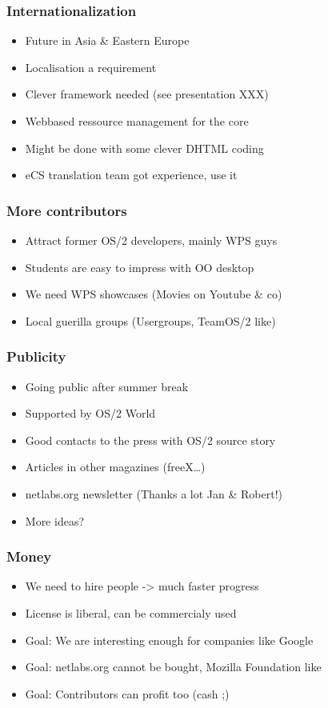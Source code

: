 \documentclass{beamer}
\begin{document}
\begin{frame}
\frametitle{Internationalization}
\begin{itemize}[<+->]
  \item Future in Asia \& Eastern Europe
  \item Localisation a requirement
  \item Clever framework needed (see presentation XXX)
  \item Webbased ressource management for the core
  \item Might be done with some clever DHTML coding
  \item eCS translation team got experience, use it
\end{itemize}
\end{frame}

\begin{frame}
\frametitle{More contributors}
\begin{itemize}[<+->]
  \item Attract former OS/2 developers, mainly WPS guys
  \item Students are easy to impress with OO desktop
  \item We need WPS showcases (Movies on Youtube \& co)
  \item Local guerilla groups (Usergroups, TeamOS/2 like)
\end{itemize}
\end{frame}

\begin{frame}
\frametitle{Publicity}
\begin{itemize}[<+->]
  \item Going public after summer break
  \item Supported by OS/2 World
  \item Good contacts to the press with OS/2 source story
  \item Articles in other magazines (freeX\ldots)
  \item netlabs.org newsletter (Thanks a lot Jan \& Robert!)
  \item More ideas?
\end{itemize}
\end{frame}

\begin{frame}
\frametitle{Money}
\begin{itemize}[<+->]
  \item We need to hire people -> much faster progress
  \item License is liberal, can be commercialy used
  \item Goal: We are interesting enough for companies like Google
  \item Goal: netlabs.org cannot be bought, Mozilla Foundation like
  \item Goal: Contributors can profit too (cash ;)
\end{itemize}
\end{frame}
\end{document}
